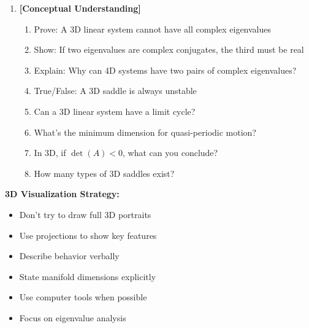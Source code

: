 \documentclass[12pt]{article}
\begin{document}
\begin{enumerate}[resume]
\item \textbf{[Conceptual Understanding]}
\begin{enumerate}[label=(\alph*)]
    \item Prove: A 3D linear system cannot have all complex eigenvalues
    \item Show: If two eigenvalues are complex conjugates, the third must be real
    \item Explain: Why can 4D systems have two pairs of complex eigenvalues?
    \item True/False: A 3D saddle is always unstable
    \item Can a 3D linear system have a limit cycle?
    \item What's the minimum dimension for quasi-periodic motion?
    \item In 3D, if $\det(A) < 0$, what can you conclude?
    \item How many types of 3D saddles exist?
\end{enumerate}
\end{enumerate}

\begin{threedtip}
\textbf{3D Visualization Strategy:}
\begin{itemize}
    \item Don't try to draw full 3D portraits
    \item Use projections to show key features
    \item Describe behavior verbally
    \item State manifold dimensions explicitly
    \item Use computer tools when possible
    \item Focus on eigenvalue analysis
\end{itemize}
\end{threedtip}
\end{document}
